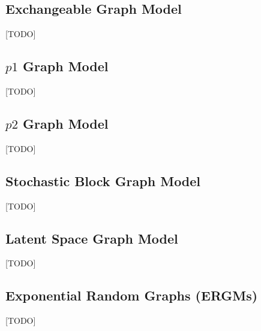 \subsection{Exchangeable Graph Model}
[TODO]

\subsection{$p1$ Graph Model}
[TODO]

\subsection{$p2$ Graph Model}
[TODO]

\subsection{Stochastic Block Graph Model}
[TODO]

\subsection{Latent Space Graph Model}
[TODO]

\subsection{Exponential Random Graphs (ERGMs)}
[TODO]

\begin{remark}
\end{remark}


